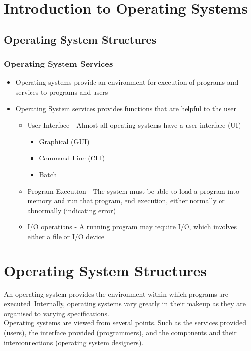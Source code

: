 \documentclass{book/custombook}
\author{Dinal Atapattu}
\begin{document}
    \maketitle
    \tableofcontents
    \chapter{Introduction to Operating Systems}
        \section{Operating System Structures}
            \subsection{Operating System Services}
                \begin{itemize}
                    \item Operating systems provide an environment for execution of programs and services to programs
                    and users
                    \item Operating System services provides functions that are helpful to the user
                        \begin{itemize}
                            \item User Interface - Almost all opeating systems have a user interface (UI)
                            \begin{itemize}
				\item Graphical (GUI)
                                \item Command Line (CLI)
                                \item Batch
                            \end{itemize}
                            \item Program Execution - The system must be able to load a program into memory and run that
                            program, end execution, either normally or abnormally (indicating error)
                            \item I/O operations - A running program may require I/O, which involves either a file or I/O device
                        \end{itemize}
                \end{itemize}
    \chapter{Operating System Structures}
	    An operating system provides the environment within which programs are executed. Internally, operating systems vary greatly in their makeup as they are organised to varying specifications.\\
        Operating systems are viewed from several points. Such as the services provided (users), the interface provided (programmers), and the components and their interconnections (operating system designers).\\
\end{document}
